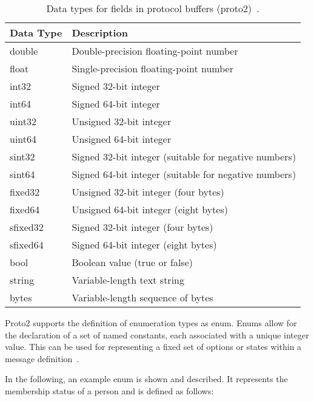 \documentclass[../MasterThesis.tex]{subfiles}
\begin{document}
\begin{description}[font=\normalfont\color{RedViolet!80!black}, style=nextline]
\begin{table}[H]
	\centering
	\begin{tabular}{ll}
		\toprule
		\textbf{Data Type} & \textbf{Description} \\
		\midrule
		double & Double-precision floating-point number \\
		float & Single-precision floating-point number \\
		int32 & Signed 32-bit integer \\
		int64 & Signed 64-bit integer \\
		uint32 & Unsigned 32-bit integer \\
		uint64 & Unsigned 64-bit integer \\
		sint32 & Signed 32-bit integer (suitable for negative numbers) \\
		sint64 & Signed 64-bit integer (suitable for negative numbers) \\
		fixed32 & Unsigned 32-bit integer (four bytes) \\
		fixed64 & Unsigned 64-bit integer (eight bytes) \\
		sfixed32 & Signed 32-bit integer (four bytes) \\
		sfixed64 & Signed 64-bit integer (eight bytes) \\
		bool & Boolean value (true or false) \\
		string & Variable-length text string \\
		bytes & Variable-length sequence of bytes \\
		\bottomrule
	\end{tabular}
	\caption[Data types for fields in protocol buffers (proto2).]{Data types for fields in protocol buffers (proto2)~\cite{proto2_doc}.}
	\label{table:proto2_data_types}
\end{table}




\item[Enums] 

Proto2 supports the definition of enumeration types as enum.
Enums allow for the declaration of a set of named constants, each associated with a unique integer value.
This can be used for representing a fixed set of options or states within a message definition~\cite{protobuffer, proto2_doc}.

In the following, an example enum is shown and described. 
It represents the membership status of a person and is defined as follows:


\end{description}
\end{document}
